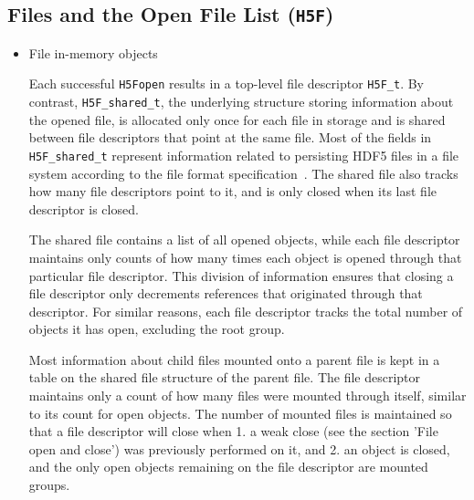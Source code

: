 \subsection{Files and the Open File List (\texttt{H5F})}



\begin{itemize}
    \item File in-memory objects

Each successful \texttt{H5Fopen} results in a top-level file descriptor \texttt{H5F\_t}. By contrast, \texttt{H5F\_shared\_t}, the underlying structure storing information about the opened file, is allocated only once for each file in storage and is shared between file descriptors that point at the same file. Most of the fields in \texttt{H5F\_shared\_t} represent information related to persisting HDF5 files in a file system according to the file format specification~\cite{ffmt}. The shared file also tracks how many file descriptors point to it, and is only closed when its last file descriptor is closed.

The shared file contains a list of all opened objects, while each file descriptor maintains only counts of how many times each object is opened through that particular file descriptor. This division of information ensures that closing a file descriptor only decrements references that originated through that descriptor. For similar reasons, each file descriptor tracks the total number of objects it has open, excluding the root group.

Most information about child files mounted onto a parent file is kept in a table on the shared file structure of the parent file. The file descriptor maintains only a count of how many files were mounted through itself, similar to its count for open objects. The number of mounted files is maintained so that a file descriptor will close when 1. a weak close (see the section 'File open and close') was previously performed on it, and 2. an object is closed, and the only open objects remaining on the file descriptor are mounted groups. 


\end{itemize}
